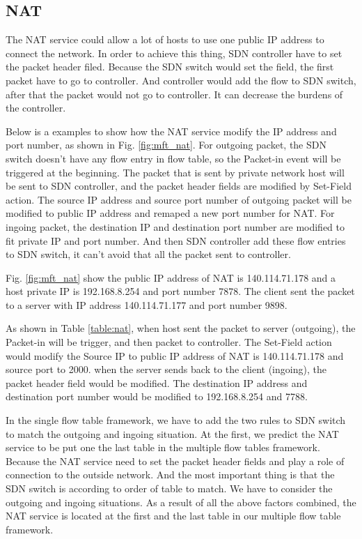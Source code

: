 \documentclass[journal]{IEEEtran}
\begin{document}
\subsection{NAT}
The NAT service could allow a lot of hosts to use one public IP address to connect the network.
In order to achieve this thing, SDN controller have to set the packet header filed.  Because the SDN switch would set the field, the first packet have to go to controller. And controller would add the flow to SDN switch, after that the packet would not go to controller. It can decrease the burdens of the controller.

Below is a examples to show how the NAT service modify the IP address and port number, as shown in Fig. \ref{fig:mft_nat}. For outgoing packet, the SDN switch doesn’t have any flow entry in flow table, so the Packet-in event will be triggered at the beginning. The packet that is sent by private network host will be sent to SDN controller, and the packet header fields are modified by Set-Field action. The source IP address and source port number of outgoing packet will be modified to public IP address and remaped a new port number for NAT. For ingoing packet, the destination IP and destination port number are modified to fit private IP and port number. And then SDN controller add these flow entries to SDN switch, it can’t avoid that all the packet sent to controller.

Fig. \ref{fig:mft_nat} show the public IP address of NAT is 140.114.71.178 and a host private IP is 192.168.8.254 and port number 7878. The client sent the packet to a server with IP address 140.114.71.177 and port number 9898.

As shown in Table \ref{table:nat}, when host sent the packet to server (outgoing), the Packet-in will be trigger, and then packet to controller. The Set-Field action would modify the Source IP to public IP address of NAT is 140.114.71.178 and source port to 2000. when the server sends back to the client (ingoing), the packet header field would be modified. The destination IP address and destination port number would be modified to 192.168.8.254 and 7788.

In the single flow table framework, we have to add the two rules to SDN switch to match the outgoing and ingoing situation. At the first, we predict the NAT service to be put one the last table in the multiple flow tables framework.  Because the NAT service need to set the packet header fields and play a role of connection to the outside network. And the most important thing is that the SDN switch is according to order of table to match. We have to consider the outgoing and ingoing situations. As a result of all the above factors combined, the NAT service is located at the first and the last table in our multiple flow table framework.
\end{document}
